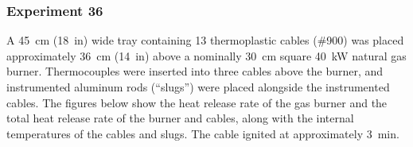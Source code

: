 \documentclass[12pt]{article}
\begin{document}
\clearpage

\subsubsection{Experiment 36}

A 45~cm (18~in) wide tray containing 13 thermoplastic cables (\#900) was placed approximately 36~cm (14~in) above a nominally 30~cm square 40~kW natural gas burner. Thermocouples were inserted into three cables above the burner, and instrumented aluminum rods (``slugs'') were placed alongside the instrumented cables. The figures below show the heat release rate of the gas burner and the total heat release rate of the burner and cables, along with the internal temperatures of the cables and slugs. The cable ignited at approximately 3~min.
\end{document}
